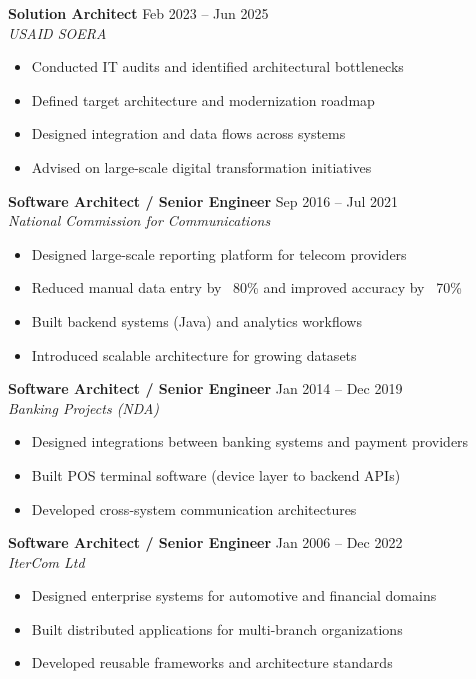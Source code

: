 \documentclass[10pt,a4paper]{article}
\begin{document}
\textbf{Solution Architect} \hfill Feb 2023 -- Jun 2025 \\
\textit{USAID SOERA}

\begin{itemize}[leftmargin=*]
\item Conducted IT audits and identified architectural bottlenecks
\item Defined target architecture and modernization roadmap
\item Designed integration and data flows across systems
\item Advised on large-scale digital transformation initiatives
\end{itemize}

\textbf{Software Architect / Senior Engineer} \hfill Sep 2016 -- Jul 2021 \\
\textit{National Commission for Communications}

\begin{itemize}[leftmargin=*]
\item Designed large-scale reporting platform for telecom providers
\item Reduced manual data entry by ~80\% and improved accuracy by ~70\%
\item Built backend systems (Java) and analytics workflows
\item Introduced scalable architecture for growing datasets
\end{itemize}

\textbf{Software Architect / Senior Engineer} \hfill Jan 2014 -- Dec 2019 \\
\textit{Banking Projects (NDA)}

\begin{itemize}[leftmargin=*]
\item Designed integrations between banking systems and payment providers
\item Built POS terminal software (device layer to backend APIs)
\item Developed cross-system communication architectures
\end{itemize}

\textbf{Software Architect / Senior Engineer} \hfill Jan 2006 -- Dec 2022 \\
\textit{IterCom Ltd}

\begin{itemize}[leftmargin=*]
\item Designed enterprise systems for automotive and financial domains
\item Built distributed applications for multi-branch organizations
\item Developed reusable frameworks and architecture standards
\end{itemize}
\end{document}
